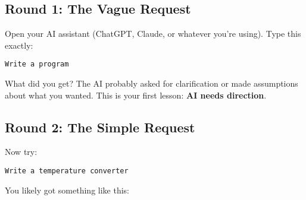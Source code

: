 \documentclass[
  letterpaper,
  DIV=11,
  numbers=noendperiod,
  oneside]{scrreprt}
\begin{document}
\subsection{Round 1: The Vague Request}\label{round-1-the-vague-request}

Open your AI assistant (ChatGPT, Claude, or whatever you're using). Type
this exactly:

\begin{verbatim}
Write a program
\end{verbatim}

What did you get? The AI probably asked for clarification or made
assumptions about what you wanted. This is your first lesson: \textbf{AI
needs direction}.

\subsection{Round 2: The Simple
Request}\label{round-2-the-simple-request}

Now try:

\begin{verbatim}
Write a temperature converter
\end{verbatim}

You likely got something like this:
\end{document}
